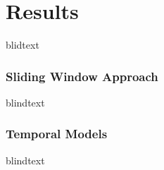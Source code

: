 \chapter{Results}
\label{sec:results}


blidtext










\subsection{Sliding Window Approach}
blindtext

\subsection{Temporal Models}
blindtext
